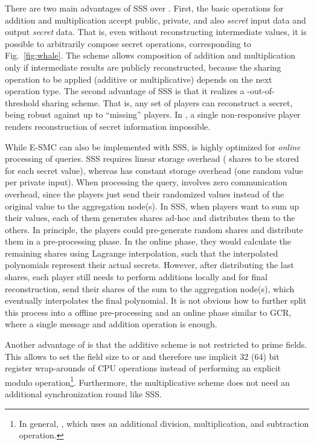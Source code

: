 \documentclass{sig-alternate}
\begin{document}
There are two main advantages of SSS over \ata. First, the basic operations for addition and multiplication accept public, private, and 
also \emph{secret} input data and output \emph{secret} data. That is, even without reconstructing intermediate values, it is possible to arbitrarily compose secret operations, corresponding to Fig.~\ref{fig:whale}. The \ata scheme allows composition of addition and multiplication only if intermediate results are publicly reconstructed, because the sharing operation to be applied (additive or multiplicative) depends on the next operation type. The second advantage of SSS is that it realizes a -out-of- threshold sharing scheme. That is, any set of  players can reconstruct a secret, being robust against up to  ``missing'' players. In \ata, a single non-responsive player renders reconstruction of secret information impossible. 

While E-SMC can also be implemented with SSS, \ata is highly optimized for \emph{online} processing of queries. SSS
requires linear storage overhead ( shares to be stored for each secret value), whereas \ata has constant storage overhead (one random value per private input). When processing the query, \ata involves zero communication overhead, since the players just send their randomized values instead of the original value to the aggregation node(s). 
In SSS, when  players want to sum up their values, each of them generates  shares ad-hoc and distributes them to the others. 
In principle, the players could pre-generate  random shares and distribute them in a pre-processing phase. In the online phase, they would calculate the remaining  shares using Lagrange interpolation, such that the interpolated polynomials represent their actual secrets. However, after distributing the last shares, each player still needs to perform  additions locally and for final reconstruction, send their shares of the sum to the aggregation node(s), which eventually interpolates the final polynomial. 
It is not obvious how to further split this process into a offline pre-processing and an online phase similar to GCR, where a single message and addition operation is enough.

Another advantage of \ata is that the additive scheme is not restricted to prime fields. This allows to set the field size to  or  and therefore use implicit 32 (64) bit register wrap-arounds of CPU operations instead of performing an explicit modulo operation\footnote{In general, , which uses an additional division, multiplication, and subtraction operation.}. 
Furthermore, the multiplicative \ata scheme does not need an additional synchronization round like SSS.  
\end{document}
